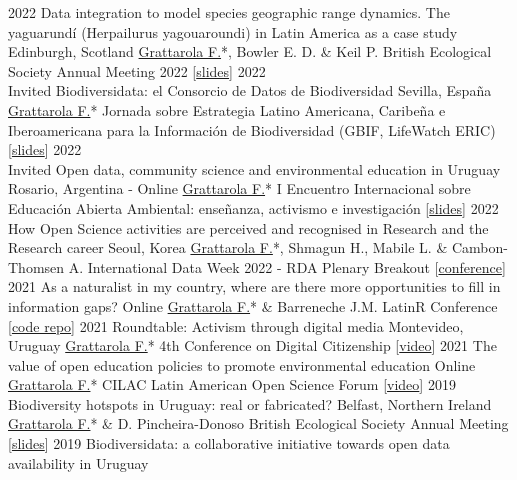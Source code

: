 \documentclass[9pt]{developercv} %
\begin{document}
\begin{entrylist}
	\entrylong
		{2022}
		{Data integration to model species geographic range dynamics. The yaguarundí (Herpailurus yagouaroundi) in Latin America as a case study}
		{Edinburgh, Scotland}
		{\underline{Grattarola F.}*, Bowler E. D. \& Keil P. \slashsep British Ecological Society Annual Meeting 2022 [\href{https://flograttarola.com/pdf/Grattarola_BES2022_short.pdf}{slides}]}
	\entrylong
		{2022\\\footnotesize{Invited}}
		{Biodiversidata: el Consorcio de Datos de Biodiversidad}
		{Sevilla, España}
		{\underline{Grattarola F.}* \slashsep Jornada sobre Estrategia Latino Americana, Caribeña e Iberoamericana para la Información de Biodiversidad (GBIF, LifeWatch ERIC) [\href{https://flograttarola.com/pdf/Biodiversidata_Sevilla.pdf}{slides}]}
	\entrylong
		{2022\\\footnotesize{Invited}}
		{Open data, community science and environmental education in Uruguay}
		{Rosario, Argentina - Online}
		{\underline{Grattarola F.}* \slashsep I Encuentro Internacional sobre Educación Abierta Ambiental: enseñanza, activismo e investigación [\href{https://flograttarola.com/pdf/IEEAA_2022.pdf}{slides}]}
	\entrylong
		{2022}
		{How Open Science activities are perceived and recognised in Research and the Research career}
		{Seoul, Korea}
		{\underline{Grattarola F.}*, Shmagun H., Mabile L. \& Cambon-Thomsen A. \slashsep International Data Week 2022 - RDA Plenary Breakout [\href{https://www.idw2022.org}{conference}]}
	\entrylong
		{2021}
		{As a naturalist in my country, where are there more opportunities to fill in information gaps?}
		{Online}
		{\underline{Grattarola F.}* \& Barreneche J.M. \slashsep LatinR Conference [\href{https://github.com/bienflorencia/LatinR2021}{code repo}]}
	\entrylong
		{2021}
		{Roundtable: Activism through digital media}
		{Montevideo, Uruguay}
		{\underline{Grattarola F.}* \slashsep 4th Conference on Digital Citizenship [\href{https://youtu.be/NNA46QEZVQI}{video}]}
	\entrylong
		{2021}
		{The value of open education policies to promote environmental education}
		{Online}
		{\underline{Grattarola F.}* \slashsep CILAC Latin American Open Science Forum [\href{https://youtu.be/W6i6y87p2IM}{video}]}
	\entrylong
		{2019}
		{Biodiversity hotspots in Uruguay: real or fabricated?}
		{Belfast, Northern Ireland}
		{\underline{Grattarola F.}* \& D. Pincheira-Donoso \slashsep British Ecological Society Annual Meeting [\href{https://flograttarola.com/pdf/FGrattarola_BES2019_WEB.pdf}{slides}]}
	\entrylong
		{2019}
		{Biodiversidata: a collaborative initiative towards open data availability in Uruguay}

\end{entrylist}
\end{document}
